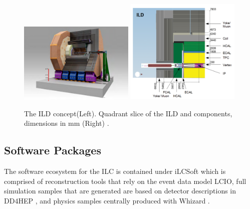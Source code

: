\begin{figure}
\label{fig:ilddet}
\includegraphics[width=0.49\textwidth]{ild3d.pdf}
\includegraphics[width=0.49\textwidth]{ildxsec.pdf}
\caption{The ILD concept(Left). Quadrant slice of the ILD and components, dimensions in mm (Right) \cite{tdrdet}.}
\end{figure}
\subsection{Software Packages}
\label{ilcsoft}

The software ecosystem for the ILC is contained under iLCSoft \cite{ilcsoft} which is comprised of reconstruction tools that rely on the event data model LCIO\cite{lcio}, full simulation samples that are generated are based on detector descriptions in DD4HEP \cite{dd4hep}, and physics samples centrally produced with Whizard \cite{ whizard}.


